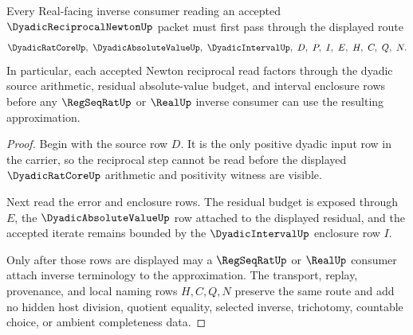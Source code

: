 \begin{theorem}
\label{thm:dyadic-reciprocal-newton-quadratic-error-route}
Every Real-facing inverse consumer reading an accepted $\DyadicReciprocalNewtonUp$ packet must first pass through the displayed route
$$
\DyadicRatCoreUp,\ \DyadicAbsoluteValueUp,\ \DyadicIntervalUp,\ D,\ P,\ I,\ E,\ H,\ C,\ Q,\ N .
$$
In particular, each accepted Newton reciprocal read factors through the dyadic source arithmetic, residual absolute-value budget, and interval enclosure rows before any $\RegSeqRatUp$ or $\RealUp$ inverse consumer can use the resulting approximation.
\end{theorem}
\begin{proof}
Begin with the source row $D$. It is the only positive dyadic input row in the carrier, so the reciprocal step cannot be read before the displayed $\DyadicRatCoreUp$ arithmetic and positivity witness are visible.

Next read the error and enclosure rows. The residual budget is exposed through $E$, the $\DyadicAbsoluteValueUp$ row attached to the displayed residual, and the accepted iterate remains bounded by the $\DyadicIntervalUp$ enclosure row $I$.

Only after those rows are displayed may a $\RegSeqRatUp$ or $\RealUp$ consumer attach inverse terminology to the approximation. The transport, replay, provenance, and local naming rows $H,C,Q,N$ preserve the same route and add no hidden host division, quotient equality, selected inverse, trichotomy, countable choice, or ambient completeness data.
\end{proof}





